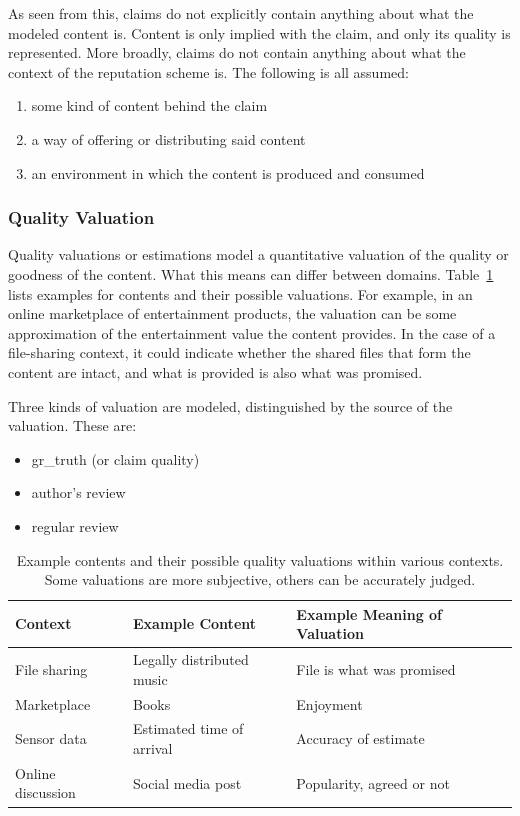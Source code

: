 \documentclass[%
    ]{\PathToTumTemplate/thesis/tum_thesis}
\begin{document}
As seen from this, claims do not explicitly contain anything about what the modeled content is.
Content is only implied with the claim, and only its quality is represented.
More broadly, claims do not contain anything about what the context of the reputation scheme is.
The following is all assumed:
\begin{enumerate}
	\item some kind of content behind the claim
	\item a way of offering or distributing said content
	\item an environment in which the content is produced and consumed
\end{enumerate}

\subsubsection{Quality Valuation}
Quality valuations or estimations model a quantitative valuation of the quality or goodness of the content.
What this means can differ between domains.
Table~\ref{tab:content_examples} lists examples for contents and their possible valuations.
For example, in an online marketplace of entertainment products, the valuation can be some approximation of the entertainment value the content provides.
In the case of a file-sharing context, it could indicate whether the shared files that form the content are intact, and what is provided is also what was promised.

Three kinds of valuation are modeled, distinguished by the source of the valuation. These are:
\begin{itemize}
	\item \gls{gr_truth} (or claim quality)
	\item author's review
	\item regular review
\end{itemize}


\begin{table}[tbp]
\centering
\begin{tabular}{lll}
\toprule
\textbf{Context}        & \textbf{Example Content} & \textbf{Example Meaning of Valuation} \\ \midrule
File sharing       & Legally distributed music & File is what was promised \\
Marketplace        & Books & Enjoyment \\
Sensor data     & Estimated time of arrival & Accuracy of estimate \\
Online discussion   & Social media post & Popularity, agreed or not \\
\bottomrule
\end{tabular}
\caption{
	Example contents and their possible quality valuations within various contexts.
	Some valuations are more subjective, others can be accurately judged.
}
\label{tab:content_examples}
\end{table}
\end{document}
